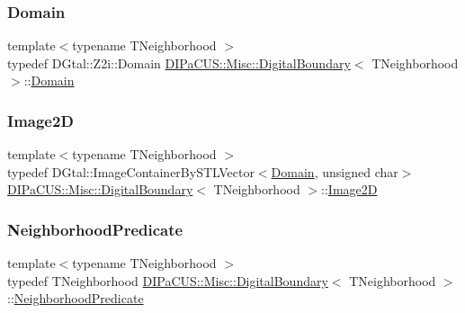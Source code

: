 \subsubsection{\texorpdfstring{Domain}{Domain}}
{\footnotesize\ttfamily template$<$typename T\+Neighborhood $>$ \\
typedef D\+Gtal\+::\+Z2i\+::\+Domain \hyperlink{structDIPaCUS_1_1Misc_1_1DigitalBoundary}{D\+I\+Pa\+C\+U\+S\+::\+Misc\+::\+Digital\+Boundary}$<$ T\+Neighborhood $>$\+::\hyperlink{structDIPaCUS_1_1Misc_1_1DigitalBoundary_a31771c0920e4124dfcba71912ca22b24}{Domain}}

\mbox{\label{structDIPaCUS_1_1Misc_1_1DigitalBoundary_ab93b0af531244071a9da5370ab17e3a4}} 
\subsubsection{\texorpdfstring{Image2D}{Image2D}}
{\footnotesize\ttfamily template$<$typename T\+Neighborhood $>$ \\
typedef D\+Gtal\+::\+Image\+Container\+By\+S\+T\+L\+Vector$<$\hyperlink{structDIPaCUS_1_1Misc_1_1DigitalBoundary_a31771c0920e4124dfcba71912ca22b24}{Domain}, unsigned char$>$ \hyperlink{structDIPaCUS_1_1Misc_1_1DigitalBoundary}{D\+I\+Pa\+C\+U\+S\+::\+Misc\+::\+Digital\+Boundary}$<$ T\+Neighborhood $>$\+::\hyperlink{structDIPaCUS_1_1Misc_1_1DigitalBoundary_ab93b0af531244071a9da5370ab17e3a4}{Image2D}}

\mbox{\label{structDIPaCUS_1_1Misc_1_1DigitalBoundary_a66b2b672db2006130bd100902d4d8684}} 
\subsubsection{\texorpdfstring{Neighborhood\+Predicate}{NeighborhoodPredicate}}
{\footnotesize\ttfamily template$<$typename T\+Neighborhood $>$ \\
typedef T\+Neighborhood \hyperlink{structDIPaCUS_1_1Misc_1_1DigitalBoundary}{D\+I\+Pa\+C\+U\+S\+::\+Misc\+::\+Digital\+Boundary}$<$ T\+Neighborhood $>$\+::\hyperlink{structDIPaCUS_1_1Misc_1_1DigitalBoundary_a66b2b672db2006130bd100902d4d8684}{Neighborhood\+Predicate}}

